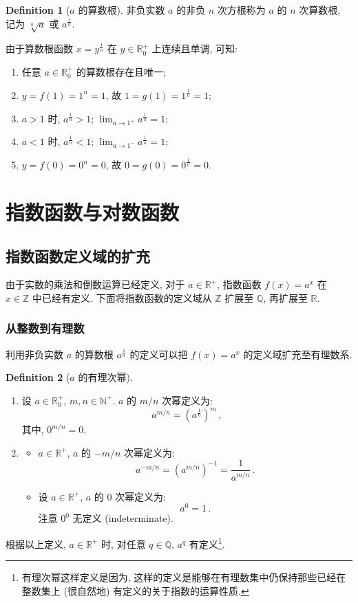 \documentclass{book}
\newcommand{\R}{\mathbb{R}}
\newcommand{\Z}{\mathbb{Z}}
\newcommand{\Q}{\mathbb{Q}}
\newcommand{\N}{\mathbb{N}}
\numberwithin{equation}{section}
\numberwithin{figure}{section}
\theoremstyle{definition}
\newtheorem{definition}{Definition}
\begin{document}
\begin{definition}[$a$ 的算数根]
  非负实数 $a$ 的非负 $n$ 次方根称为 $a$ 的 $n$ 次算数根, 记为 $\sqrt[n]{a}$ 或 $a^{\frac{1}{n}}$.
\end{definition}
由于算数根函数 $x=y^{\frac{1}{n}}$ 在 $y\in\R^+_0$ 上连续且单调, 可知:
\begin{enumerate}
  \item 任意 $a\in\R^+_0$ 的算数根存在且唯一;
  \item $y=f(1)=1^n=1$, 故 $1=g(1)=1^{\frac{1}{n}}=1$;
  \item $a>1$ 时, $a^{\frac{1}{n}}>1$; $\lim_{a\to 1^+}a^{\frac{1}{n}}=1$;
  \item $a<1$ 时, $a^{\frac{1}{n}}<1$; $\lim_{a\to 1^-}a^{\frac{1}{n}}=1$;
  \item $y=f(0)=0^n=0$, 故 $0=g(0)=0^{\frac{1}{n}}=0$.
\end{enumerate}
%
\section{指数函数与对数函数}
\subsection{指数函数定义域的扩充}
由于实数的乘法和倒数运算已经定义, 对于 $a\in\R^+$, 指数函数 $f(x)=a^x$ 在 $x\in\Z$ 中已经有定义. 下面将指数函数的定义域从 $\Z$ 扩展至 $\Q$, 再扩展至 $\R$.

\subsubsection{从整数到有理数}
利用非负实数 $a$ 的算数根 $a^{\frac{1}{n}}$ 的定义可以把 $f(x)=a^x$ 的定义域扩充至有理数系.
\begin{definition}[$a$ 的有理次幂]
  \leavevmode

  \begin{enumerate}
    \item 设 $a\in\R^+_0$, $m,n\in\N^+$. $a$ 的 $m/n$ 次幂定义为:
      \begin{equation*}
	a^{m/n}=\left( a^{\frac{1}{n}} \right)^m\,,
      \end{equation*}
      其中, $0^{m/n}=0$.
    \item 
      \begin{itemize}
	\item $a\in\R^+$, $a$ 的 $-m/n$ 次幂定义为:
	  \begin{equation*}
	    a^{-m/n}=\left( a^{m/n} \right)^{-1}=\frac{1}{a^{m/n}}\,.
	  \end{equation*}
	\item 设 $a\in\R^+$, $a$ 的 $0$ 次幂定义为:
	  \begin{equation*}
	    a^0=1\,.
	  \end{equation*}
	  注意 $0^0$ 无定义 (indeterminate).
      \end{itemize}
  \end{enumerate}
\end{definition}
根据以上定义, $a\in\R^+$ 时, 对任意 $q\in\Q$, $a^q$ 有定义\footnote{有理次幂这样定义是因为, 这样的定义是能够在有理数集中仍保持那些已经在整数集上 (很自然地) 有定义的关于指数的运算性质.}.
\end{document}
